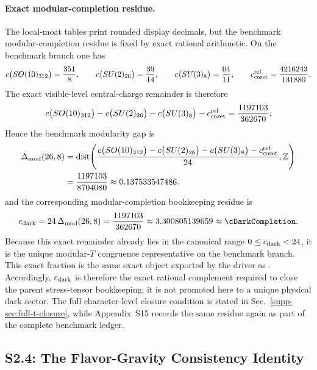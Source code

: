 \documentclass[11pt]{article}
\begin{document}
\paragraph{Exact modular-completion residue.}
The local-moat tables print rounded display decimals, but the benchmark modular-completion residue is fixed by exact rational arithmetic. On the benchmark branch one has
\begin{equation}
 c\bigl(SO(10)_{312}\bigr)=\frac{351}{8},
 \qquad
 c\bigl(SU(2)_{26}\bigr)=\frac{39}{14},
 \qquad
 c\bigl(SU(3)_8\bigr)=\frac{64}{11},
 \qquad
 c_{\rm coset}^{\rm ref}=\frac{4216243}{131880}.
\end{equation}
The exact visible-level central-charge remainder is therefore
\begin{equation}
 c\bigl(SO(10)_{312}\bigr)-c\bigl(SU(2)_{26}\bigr)-c\bigl(SU(3)_8\bigr)-c_{\rm coset}^{\rm ref}
 =
 \frac{1197103}{362670}.
\end{equation}
Hence the benchmark modularity gap is
\begin{equation}
\begin{aligned}
 \Delta_{\rm mod}(26,8)
 &= \operatorname{dist}\!\left(
 \frac{c\bigl(SO(10)_{312}\bigr)-c\bigl(SU(2)_{26}\bigr)-c\bigl(SU(3)_8\bigr)-c_{\rm coset}^{\rm ref}}{24},
 \mathbb Z
 \right) \\
 &= \frac{1197103}{8704080}
 \approx 0.137533547486.
\end{aligned}
\end{equation}
and the corresponding modular-completion bookkeeping residue is
\begin{equation}
 c_{\rm dark}
 =
 24\,\Delta_{\rm mod}(26,8)
 =
 \frac{1197103}{362670}
 \approx
 3.300805139659
 \approx
 \cDarkCompletion.
\end{equation}
Because this exact remainder already lies in the canonical range $0\leq c_{\rm dark}<24$, it is the unique modular-$T$ congruence representative on the benchmark branch. This exact fraction is the same exact object exported by the driver as . Accordingly, $c_{\rm dark}$ is therefore the exact rational complement required to close the parent stress-tensor bookkeeping; it is not promoted here to a unique physical dark sector. The full character-level closure condition is stated in Sec.~\ref{supp-sec:full-t-closure}, while Appendix~S15 records the same residue again as part of the complete benchmark ledger.

\subsection*{S2.4: The Flavor-Gravity Consistency Identity}
\end{document}
